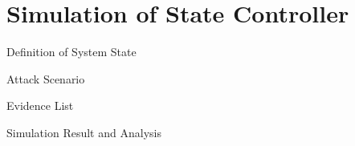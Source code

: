 
\section{Simulation of State Controller}

\begin{frame}{Definition of System State}
    
\end{frame}

\begin{frame}{Attack Scenario}
    
\end{frame}

\begin{frame}{Evidence List}
    
\end{frame}

\begin{frame}{Simulation Result and Analysis}
    
\end{frame}

